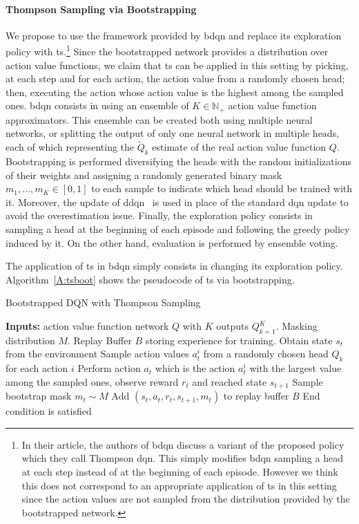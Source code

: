 \paragraph{Thompson Sampling via Bootstrapping} We propose to use the framework provided by \gls{bdqn} and replace its exploration policy with \gls{ts}.\footnote{In their article, the authors of \gls{bdqn} discuss a variant of the proposed policy which they call Thompson \gls{dqn}. This simply modifies \gls{bdqn} sampling a head at each step instead of at the beginning of each episode. However we think this does not correspond to an appropriate application of \gls{ts} in this setting since the action values are not sampled from the distribution provided by the bootstrapped network.} Since the bootstrapped network provides a distribution over action value functions, we claim that \gls{ts} can be applied in this setting by picking, at each step and for each action, the action value from a randomly chosen head; then, executing the action whose action value is the highest among the sampled ones.
\gls{bdqn} consists in using an ensemble of $K \in \mathbb{N_+}$ action value function approximators. This ensemble can be created both using multiple neural networks, or splitting the output of only one neural network in multiple heads, each of which representing the $\tilde{Q}_k $ estimate of the real action value function $Q$. Bootstrapping is performed diversifying the heads with the random initializations of their weights and assigning a randomly generated binary mask $m_1, \dots, m_K \in [0,1]$ to each sample to indicate which head should be trained with it. Moreover, the update of \gls{ddqn}~\cite{van2016deep} is used in place of the standard \gls{dqn} update to avoid the overestimation issue. Finally, the exploration policy consists in sampling a head at the beginning of each episode and following the greedy policy induced by it. On the other hand, evaluation is performed by ensemble voting.

The application of \gls{ts} in \gls{bdqn} simply consists in changing its exploration policy. Algorithm~\ref{A:tsboot} shows the pseudocode of \gls{ts} via bootstrapping.
\begin{algorithm}
\caption{Bootstrapped DQN with Thompson Sampling}
\begin{algorithmic}[1]\label{A:tsboot}
  \STATE \textbf{Inputs:} action value function network $Q$ with $K$ outputs $Q_{k=1}^K$. Masking distribution $M$. Replay Buffer $B$ storing experience for training.
  \REPEAT
  \STATE Obtain state $s_t$ from the environment
  \STATE Sample action values $a_t^i$ from a randomly chosen head $Q_k$ for each action $i$
  \STATE Perform action $a_t$ which is the action $a_t^i$ with the largest value among the sampled ones, observe reward $r_t$ and reached state $s_{t+1}$
  \STATE Sample bootstrap mask $m_t \sim M$
  \STATE Add $(s_t, a_t, r_t, s_{t+1}, m_t)$ to replay buffer $B$
  \UNTIL End condition is satisfied
\end{algorithmic}
\end{algorithm}

